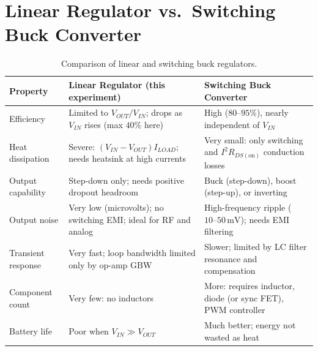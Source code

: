 \documentclass[11pt,a4paper]{article}
\begin{document}
\section{Linear Regulator vs.\ Switching Buck Converter}
\begin{table}[htbp]
\centering
\caption{Comparison of linear and switching buck regulators.}
\label{tab:lin_vs_buck}
\small
\begin{tabularx}{\textwidth}{l X X}
\toprule
\textbf{Property} & \textbf{Linear Regulator (this experiment)} & \textbf{Switching Buck Converter} \\
\midrule
\addlinespace
Efficiency & Limited to $V_{OUT}/V_{IN}$; drops as $V_{IN}$ rises (max $40\%$ here) & High ($80\text{--}95\%$), nearly independent of $V_{IN}$ \\
\addlinespace
Heat dissipation & Severe: $(V_{IN}-V_{OUT})I_{LOAD}$; needs heatsink at high currents & Very small: only switching and $I^2 R_{DS(\text{on})}$ conduction losses \\
\addlinespace
Output capability & Step-down only; needs positive dropout headroom & Buck (step-down), boost (step-up), or inverting \\
\addlinespace
Output noise & Very low (microvolts); no switching EMI; ideal for RF and analog & High-frequency ripple ($10\text{--}50\,\text{mV}$); needs EMI filtering \\
\addlinespace
Transient response & Very fast; loop bandwidth limited only by op-amp GBW & Slower; limited by LC filter resonance and compensation \\
\addlinespace
Component count & Very few: no inductors & More: requires inductor, diode (or sync FET), PWM controller \\
\addlinespace
Battery life & Poor when $V_{IN} \gg V_{OUT}$ & Much better; energy not wasted as heat \\
\bottomrule
\end{tabularx}
\end{table}

\clearpage
\end{document}
